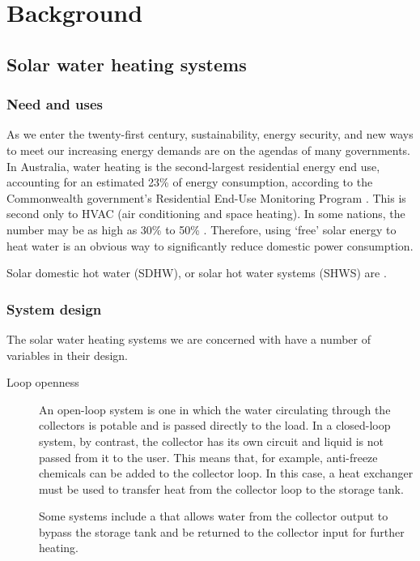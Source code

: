 \chapter{Background}

\section{Solar water heating systems}

\subsection{Need and uses}

As we enter the twenty-first century, sustainability, energy security, and new ways to meet our increasing energy demands are on the agendas of many governments.
In Australia, water heating is the second-largest residential energy end use, accounting for an estimated 23\% of energy consumption, according to the Commonwealth government's Residential End-Use Monitoring Program \cite{REMP12}.
This is second only to HVAC (air conditioning and space heating).
In some nations, the number may be as high as 30\% to 50\% \cite{Lane96}.
Therefore, using `free' solar energy to heat water is an obvious way to significantly reduce domestic power consumption.

Solar domestic hot water (SDHW), or solar hot water systems (SHWS) are .

\subsection{System design}

The solar water heating systems we are concerned with have a number of variables in their design.

\begin{description}
	\item[Loop openness] An open-loop system is one in which the water circulating through the collectors is potable and is passed directly to the load.
		In a closed-loop system, by contrast, the collector has its own circuit and liquid is not passed from it to the user.
		This means that, for example, anti-freeze chemicals can be added to the collector loop.
		In this case, a heat exchanger must be used to transfer heat from the collector loop to the storage tank.
	\item[] Some systems include a  that allows water from the collector output to bypass the storage tank and be returned to the collector input for further heating.
\end{description}

